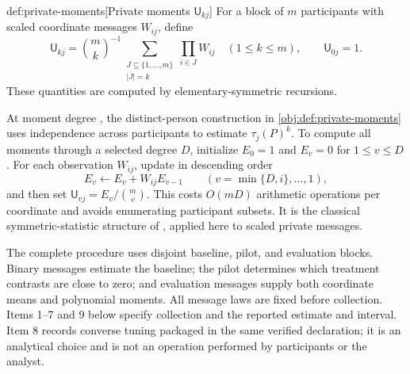 \begin{definitionv}{def:private-moments}[Private moments $\mathsf U_{kj}$]
For a block of \(m\) participants with scaled coordinate messages \(W_{ij}\), define
\[
\mathsf U_{kj}
=
\binom{m}{k}^{-1}
\sum_{\substack{J\subseteq\{1,\ldots,m\}\\ |J|=k}}
\prod_{i\in J}W_{ij}
\quad(1\le k\le m),
\qquad
\mathsf U_{0j}=1.
\]
These quantities are computed by elementary-symmetric recursions.
\end{definitionv}

At moment degree , the distinct-person construction in \cref{obj:def:private-moments} uses independence across participants to estimate \(\tau_j(P)^k\). To compute all moments through a selected degree \(D\), initialize \(E_0=1\) and \(E_v=0\) for \(1\le v\le D\). For each observation \(W_{ij}\), update in descending order
\[
E_v\leftarrow E_v+W_{ij}E_{v-1}
\qquad(v=\min\{D,i\},\ldots,1),
\]
and then set \(\mathsf U_{vj}=E_v/\binom mv\). This costs \(O(mD)\) arithmetic operations per coordinate and avoids enumerating participant subsets. It is the classical symmetric-statistic structure of \citet{Hoeffding1948}, applied here to scaled private messages.

The complete procedure uses disjoint baseline, pilot, and evaluation blocks. Binary messages estimate the baseline; the pilot determines which treatment contrasts are close to zero; and evaluation messages supply both coordinate means and polynomial moments. All message laws are fixed before collection. Items 1--7 and 9 below specify collection and the reported estimate and interval. Item 8 records converse tuning packaged in the same verified declaration; it is an analytical choice and is not an operation performed by participants or the analyst.

